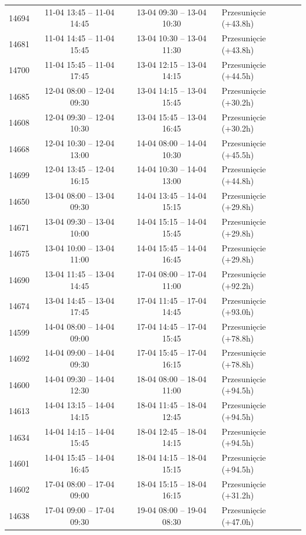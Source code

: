 \begin{table}[htbp]
\begin{tabular}{|r|c|c|l|}
14694 & 11-04 13:45 -- 11-04 14:45 & 13-04 09:30 -- 13-04 10:30 & Przesunięcie (+43.8h) \\ 
14681 & 11-04 14:45 -- 11-04 15:45 & 13-04 10:30 -- 13-04 11:30 & Przesunięcie (+43.8h) \\ 
14700 & 11-04 15:45 -- 11-04 17:45 & 13-04 12:15 -- 13-04 14:15 & Przesunięcie (+44.5h) \\ 
14685 & 12-04 08:00 -- 12-04 09:30 & 13-04 14:15 -- 13-04 15:45 & Przesunięcie (+30.2h) \\ 
14608 & 12-04 09:30 -- 12-04 10:30 & 13-04 15:45 -- 13-04 16:45 & Przesunięcie (+30.2h) \\ 
14668 & 12-04 10:30 -- 12-04 13:00 & 14-04 08:00 -- 14-04 10:30 & Przesunięcie (+45.5h) \\ 
14699 & 12-04 13:45 -- 12-04 16:15 & 14-04 10:30 -- 14-04 13:00 & Przesunięcie (+44.8h) \\ 
14650 & 13-04 08:00 -- 13-04 09:30 & 14-04 13:45 -- 14-04 15:15 & Przesunięcie (+29.8h) \\ 
14671 & 13-04 09:30 -- 13-04 10:00 & 14-04 15:15 -- 14-04 15:45 & Przesunięcie (+29.8h) \\ 
14675 & 13-04 10:00 -- 13-04 11:00 & 14-04 15:45 -- 14-04 16:45 & Przesunięcie (+29.8h) \\ 
14690 & 13-04 11:45 -- 13-04 14:45 & 17-04 08:00 -- 17-04 11:00 & Przesunięcie (+92.2h) \\ 
14674 & 13-04 14:45 -- 13-04 17:45 & 17-04 11:45 -- 17-04 14:45 & Przesunięcie (+93.0h) \\ 
14599 & 14-04 08:00 -- 14-04 09:00 & 17-04 14:45 -- 17-04 15:45 & Przesunięcie (+78.8h) \\ 
14692 & 14-04 09:00 -- 14-04 09:30 & 17-04 15:45 -- 17-04 16:15 & Przesunięcie (+78.8h) \\ 
14600 & 14-04 09:30 -- 14-04 12:30 & 18-04 08:00 -- 18-04 11:00 & Przesunięcie (+94.5h) \\ 
14613 & 14-04 13:15 -- 14-04 14:15 & 18-04 11:45 -- 18-04 12:45 & Przesunięcie (+94.5h) \\ 
14634 & 14-04 14:15 -- 14-04 15:45 & 18-04 12:45 -- 18-04 14:15 & Przesunięcie (+94.5h) \\ 
14601 & 14-04 15:45 -- 14-04 16:45 & 18-04 14:15 -- 18-04 15:15 & Przesunięcie (+94.5h) \\ 
14602 & 17-04 08:00 -- 17-04 09:00 & 18-04 15:15 -- 18-04 16:15 & Przesunięcie (+31.2h) \\ 
14638 & 17-04 09:00 -- 17-04 09:30 & 19-04 08:00 -- 19-04 08:30 & Przesunięcie (+47.0h) \\ 

\end{tabular}
\end{table}
